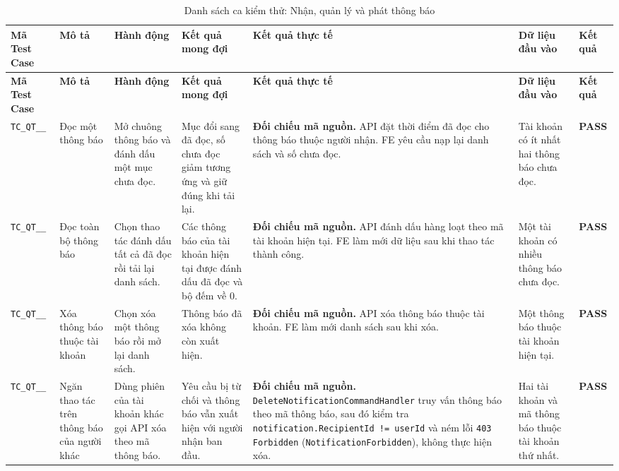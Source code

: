 \begin{landscape}
{
\fontsize{9.5}{11.5}\selectfont
\setlength{\tabcolsep}{3pt}
\renewcommand{\arraystretch}{1.2}
\begin{longtable}{|>{\raggedright\arraybackslash}p{2.1cm}|>{\raggedright\arraybackslash}p{2.8cm}|>{\raggedright\arraybackslash}p{3.8cm}|>{\raggedright\arraybackslash}p{4.0cm}|>{\raggedright\arraybackslash}p{5.0cm}|>{\raggedright\arraybackslash}p{3.2cm}|>{\centering\arraybackslash}p{1.3cm}|}
    \caption{Danh sách ca kiểm thử: Nhận, quản lý và phát thông báo} \label{tab:ts-qt-05} \\
    \hline
    \textbf{Mã Test Case} & \textbf{Mô tả} & \textbf{Hành động} & \textbf{Kết quả mong đợi} & \textbf{Kết quả thực tế} & \textbf{Dữ liệu đầu vào} & \textbf{Kết quả} \\
    \hline
    \endfirsthead
    \hline
    \textbf{Mã Test Case} & \textbf{Mô tả} & \textbf{Hành động} & \textbf{Kết quả mong đợi} & \textbf{Kết quả thực tế} & \textbf{Dữ liệu đầu vào} & \textbf{Kết quả} \\
    \hline
    \endhead
    \hline
    \endfoot
    \hline
    \endlastfoot
    \texttt{TC\_\allowbreak QT\_\allowbreak 05\_\allowbreak 01} & Đọc một thông báo & Mở chuông thông báo và đánh dấu một mục chưa đọc. & Mục đổi sang đã đọc, số chưa đọc giảm tương ứng và giữ đúng khi tải lại. & \textbf{Đối chiếu mã nguồn.} API đặt thời điểm đã đọc cho thông báo thuộc người nhận. FE yêu cầu nạp lại danh sách và số chưa đọc. & Tài khoản có ít nhất hai thông báo chưa đọc. & \textbf{PASS} \\
    \hline
    \texttt{TC\_\allowbreak QT\_\allowbreak 05\_\allowbreak 02} & Đọc toàn bộ thông báo & Chọn thao tác đánh dấu tất cả đã đọc rồi tải lại danh sách. & Các thông báo của tài khoản hiện tại được đánh dấu đã đọc và bộ đếm về 0. & \textbf{Đối chiếu mã nguồn.} API đánh dấu hàng loạt theo mã tài khoản hiện tại. FE làm mới dữ liệu sau khi thao tác thành công. & Một tài khoản có nhiều thông báo chưa đọc. & \textbf{PASS} \\
    \hline
    \texttt{TC\_\allowbreak QT\_\allowbreak 05\_\allowbreak 03} & Xóa thông báo thuộc tài khoản & Chọn xóa một thông báo rồi mở lại danh sách. & Thông báo đã xóa không còn xuất hiện. & \textbf{Đối chiếu mã nguồn.} API xóa thông báo thuộc tài khoản. FE làm mới danh sách sau khi xóa. & Một thông báo thuộc tài khoản hiện tại. & \textbf{PASS} \\
    \hline
    \texttt{TC\_\allowbreak QT\_\allowbreak 05\_\allowbreak 04} & Ngăn thao tác trên thông báo của người khác & Dùng phiên của tài khoản khác gọi API xóa theo mã thông báo. & Yêu cầu bị từ chối và thông báo vẫn xuất hiện với người nhận ban đầu. & \textbf{Đối chiếu mã nguồn.} \texttt{DeleteNotificationCommandHandler} truy vấn thông báo theo mã thông báo, sau đó kiểm tra \texttt{notification.RecipientId != userId} và ném lỗi \texttt{403 Forbidden} (\texttt{NotificationForbidden}), không thực hiện xóa. & Hai tài khoản và mã thông báo thuộc tài khoản thứ nhất. & \textbf{PASS} \\

\end{longtable}}
\end{landscape}
